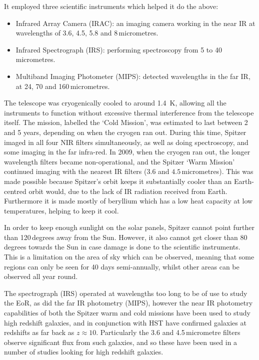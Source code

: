        It employed three scientific instruments which helped it do the above:
        \begin{itemize}
            \item Infrared Array Camera (IRAC): an imaging camera working in the near IR at wavelengths of 3.6, 4.5, 5.8 and 8\,micrometres.
            \item Infrared Spectrograph (IRS): performing spectroscopy from 5 to 40\,micrometres.
            \item Multiband Imaging Photometer (MIPS): detected wavelengths in the far IR, at 24, 70 and 160\,micrometres.
        \end{itemize}

        The telescope was cryogenically cooled to around \SI{1.4}{\kelvin}, allowing all the instruments to function without excessive thermal interference from the telescope itself. The mission, labelled the `Cold Mission', was estimated to last between 2 and 5 years, depending on when the cryogen ran out. During this time, Spitzer imaged in all four NIR filters simultaneously, as well as doing spectroscopy, and some imaging in the far infra-red. In 2009, when the cryogen ran out, the longer wavelength filters became non-operational, and the Spitzer `Warm Mission' continued imaging with the nearest IR filters ($3.6$ and $4.5$\,micrometres). This was made possible because Spitzer’s orbit keeps it substantially cooler than an Earth-centred orbit would, due to the lack of IR radiation received from Earth. Furthermore it is made mostly of beryllium which has a low heat capacity at low temperatures, helping to keep it cool.

        In order to keep enough sunlight on the solar panels, Spitzer cannot point further than 120\,degrees away from the Sun. However, it also cannot get closer than 80\,degrees towards the Sun in case damage is done to the scientific instruments. This is a limitation on the area of sky which can be observed, meaning that some regions can only be seen for 40 days semi-annually, whilst other areas can be observed all year round.

        The spectrograph (IRS) operated at wavelengths too long to be of use to study the EoR, as did the far IR photometry (MIPS), however the near IR photometry capabilities of both the Spitzer warm and cold missions have been used to study high redshift galaxies, and in conjunction with HST have confirmed galaxies at redshifts as far back as $z\approx10$. Particularly the 3.6 and 4.5\,micrometre filters observe significant flux from such galaxies, and so these have been used in a number of studies looking for high redshift galaxies.

